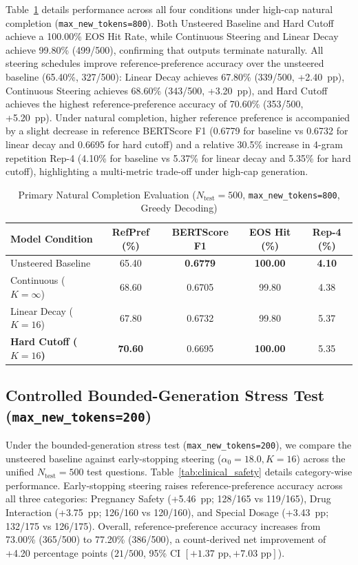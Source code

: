 \documentclass[conference]{IEEEtran}
\begin{document}
Table~\ref{tab:long_gen} details performance across all four conditions under high-cap natural completion (\texttt{max\_new\_tokens=800}). Both Unsteered Baseline and Hard Cutoff achieve a 100.00\% EOS Hit Rate, while Continuous Steering and Linear Decay achieve 99.80\% (499/500), confirming that outputs terminate naturally. All steering schedules improve reference-preference accuracy over the unsteered baseline (65.40\%, 327/500): Linear Decay achieves 67.80\% (339/500, +2.40~pp), Continuous Steering achieves 68.60\% (343/500, +3.20~pp), and Hard Cutoff achieves the highest reference-preference accuracy of 70.60\% (353/500, +5.20~pp). Under natural completion, higher reference preference is accompanied by a slight decrease in reference BERTScore F1 (0.6779 for baseline vs 0.6732 for linear decay and 0.6695 for hard cutoff) and a relative 30.5\% increase in 4-gram repetition Rep-4 (4.10\% for baseline vs 5.37\% for linear decay and 5.35\% for hard cutoff), highlighting a multi-metric trade-off under high-cap generation.

\begin{table}[t]
\caption{Primary Natural Completion Evaluation ($N_{\text{test}}=500$, \texttt{max\_new\_tokens=800}, Greedy Decoding)}
\label{tab:long_gen}
\centering
\begin{tabular}{lcccc}
\toprule
\textbf{Model Condition} & \textbf{RefPref (\%)} & \textbf{BERTScore F1} & \textbf{EOS Hit (\%)} & \textbf{Rep-4 (\%)} \\
\midrule
Unsteered Baseline & 65.40 & \textbf{0.6779} & \textbf{100.00} & \textbf{4.10} \\
Continuous ($K{=}\infty$) & 68.60 & 0.6705 & 99.80 & 4.38 \\
Linear Decay ($K{=}16$) & 67.80 & 0.6732 & 99.80 & 5.37 \\
\textbf{Hard Cutoff ($K{=}16$)} & \textbf{70.60} & 0.6695 & \textbf{100.00} & 5.35 \\
\bottomrule
\end{tabular}
\end{table}

\subsection{Controlled Bounded-Generation Stress Test (\texttt{max\_new\_tokens=200})}
Under the bounded-generation stress test (\texttt{max\_new\_tokens=200}), we compare the unsteered baseline against early-stopping steering ($\alpha_0=18.0, K=16$) across the unified $N_{\text{test}}=500$ test questions. Table~\ref{tab:clinical_safety} details category-wise performance. Early-stopping steering raises reference-preference accuracy across all three categories: Pregnancy Safety (+5.46~pp; 128/165 vs 119/165), Drug Interaction (+3.75~pp; 126/160 vs 120/160), and Special Dosage (+3.43~pp; 132/175 vs 126/175). Overall, reference-preference accuracy increases from 73.00\% (365/500) to 77.20\% (386/500), a count-derived net improvement of +4.20 percentage points ($21/500$, 95\% CI $[+1.37\text{ pp}, +7.03\text{ pp}]$).
\end{document}
